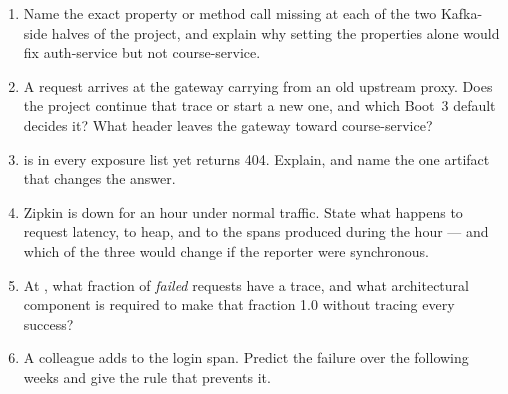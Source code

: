 \begin{quiz}
\begin{enumerate}
  \item Name the exact property or method call missing at each of the
  two Kafka-side halves of the project, and explain why setting the
  properties alone would fix auth-service but not course-service.
  \item A request arrives at the gateway carrying
   from an old upstream proxy. Does the project
  continue that trace or start a new one, and which Boot~3 default
  decides it? What header leaves the gateway toward course-service?
  \item {} is in every exposure list yet
  returns 404. Explain, and name the one artifact that changes the
  answer.
  \item Zipkin is down for an hour under normal traffic. State what
  happens to request latency, to heap, and to the spans produced
  during the hour --- and which of the three would change if the
  reporter were synchronous.
  \item At , what fraction of \emph{failed}
  requests have a trace, and what architectural component is required
  to make that fraction 1.0 without tracing every success?
  \item A colleague adds 
  to the login span. Predict the failure over the following weeks and
  give the rule that prevents it.
\end{enumerate}
\end{quiz}
